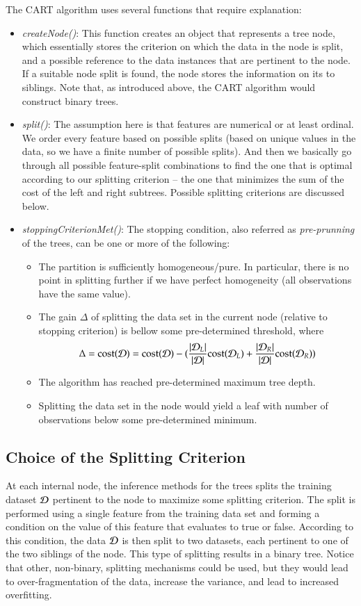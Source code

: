 The CART algorithm uses several functions that require explanation:
\begin{itemize}
\item {\em createNode()}: This function creates an object that represents a tree node, which essentially stores the criterion on which the data in the node is split, and a possible reference to the data instances that are pertinent to the node. If a suitable node split is found, the node stores the information on its to siblings. Note that, as introduced above, the CART algorithm would construct binary trees.
\item {\em split()}: The assumption here is that features are numerical or at least ordinal. We order every feature based on possible splits (based on unique values in the data, so we have a finite number of possible splits). And then we basically go through all possible feature-split combinations to find the one that is optimal according to our splitting criterion -- the one that minimizes the sum of the cost of the left and right subtrees. Possible splitting criterions are discussed below.

\item {\em stoppingCriterionMet()}: The stopping condition, also referred as {\em pre-prunning} of the trees, can be one or more of the following:
\begin{itemize}
\item The partition is sufficiently homogeneous/pure. In particular, there is no point in splitting further if we have perfect homogeneity (all observations have the same value).
\item The gain $\Delta$ of splitting the data set in the current node (relative to stopping criterion) is bellow some pre-determined threshold, where
$$ \Delta = {\rm cost}(\mathcal{D}) = {\rm cost}(\mathcal{D})-({|\mathcal{D}_L|\over |\mathcal{D}|}{\rm cost}(\mathcal{D}_L) + {|\mathcal{D}_R|\over |\mathcal{D}|}{\rm cost}(\mathcal{D}_R))$$
\item The algorithm has reached pre-determined maximum tree depth.
\item Splitting the data set in the node would yield a leaf with number of observations below some pre-determined minimum.
\end{itemize}
\end{itemize}


\subsection*{Choice of the Splitting Criterion}

At each internal node, the inference methods for the trees splits the training dataset $\mathcal{D}$ pertinent to the node to maximize some splitting criterion. The split is performed using a single feature from the training data set and forming a condition on the value of this feature that evaluates to true or false. According to this condition, the data $\mathcal{D}$ is then split to two datasets, each pertinent to one of the two siblings of the node. This type of splitting results in a binary tree. Notice that other, non-binary, splitting mechanisms could be used, but they would lead to over-fragmentation of the data, increase the variance, and lead to increased overfitting.

